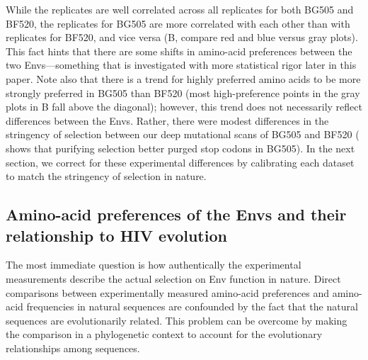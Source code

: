 \documentclass[9pt]{elife}
\begin{document}
While the replicates are well correlated across all replicates for both BG505 and BF520, the replicates for BG505 are more correlated with each other than with replicates for BF520, and vice versa (B, compare red and blue versus gray plots).
This fact hints that there are some shifts in amino-acid preferences between the two Envs---something that is investigated with more statistical rigor later in this paper.
Note also that there is a trend for highly preferred amino acids to be more strongly preferred in BG505 than BF520 (most high-preference points in the gray plots in B fall above the diagonal); however, this trend does not necessarily reflect differences between the Envs.
Rather, there were modest differences in the stringency of selection between our deep mutational scans of BG505 and BF520 ( shows that purifying selection better purged stop codons in BG505).
In the next section, we correct for these experimental differences by calibrating each dataset to match the stringency of selection in nature.

\subsection{Amino-acid preferences of the Envs and their relationship to HIV evolution}
The most immediate question is how authentically the experimental measurements describe the actual selection on Env function in nature.
Direct comparisons between experimentally measured amino-acid preferences and amino-acid frequencies in natural sequences are confounded by the fact that the natural sequences are evolutionarily related.
This problem can be overcome by making the comparison in a phylogenetic context to account for the evolutionary relationships among sequences.
\end{document}
